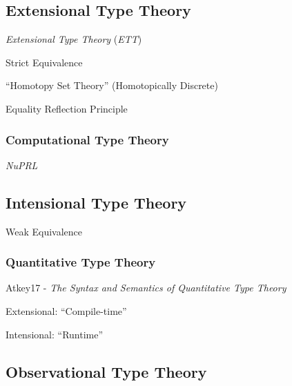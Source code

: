 \subsection{Extensional Type Theory}\label{sec:extensional_type}
\cite{harper12}

\emph{Extensional Type Theory} (\emph{ETT})

Strict Equivalence

``Homotopy Set Theory'' (Homotopically Discrete)

Equality Reflection Principle



\subsubsection{Computational Type Theory}\label{sec:computational_type}

\emph{NuPRL}



\subsection{Intensional Type Theory}\label{sec:intensional_type}
\cite{harper12}

Weak Equivalence



\subsubsection{Quantitative Type Theory}\label{sec:quantitative_type}

Atkey17 - \emph{The Syntax and Semantics of Quantitative Type Theory}

Extensional: ``Compile-time''

Intensional: ``Runtime''



\subsection{Observational Type Theory}\label{sec:observational_type}

